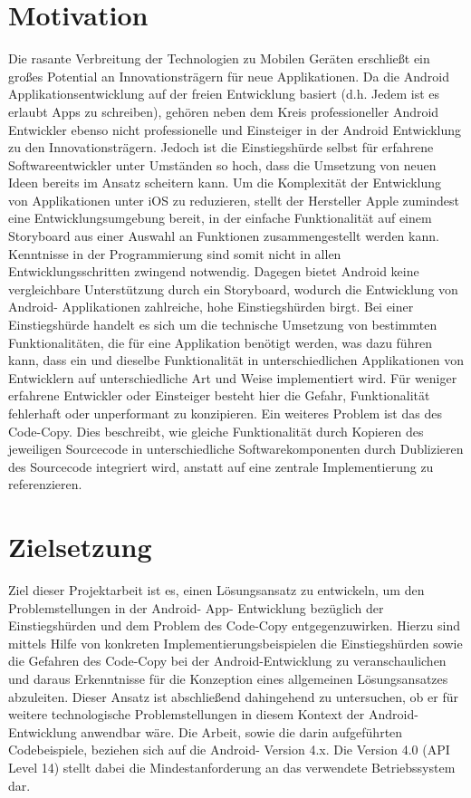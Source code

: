 \documentclass[12pt,oneside,a4paper,bibtotoc,liststotoc]{scrreprt}
\begin{document}
\section{Motivation}
Die rasante Verbreitung der Technologien zu Mobilen Geräten erschließt ein großes Potential an Innovationsträgern für neue Applikationen. Da die Android Applikationsentwicklung auf der freien Entwicklung basiert (d.h. Jedem ist es erlaubt Apps zu schreiben), gehören neben dem Kreis professioneller Android Entwickler ebenso nicht professionelle und Einsteiger in der Android Entwicklung zu den Innovationsträgern. Jedoch ist die Einstiegshürde selbst für erfahrene Softwareentwickler unter Umständen so hoch, dass die Umsetzung von neuen Ideen bereits im Ansatz scheitern kann. Um die Komplexität der Entwicklung von Applikationen unter iOS zu reduzieren, stellt der Hersteller Apple zumindest eine Entwicklungsumgebung bereit, in der einfache Funktionalität auf einem Storyboard aus einer Auswahl an Funktionen zusammengestellt werden kann. Kenntnisse in der Programmierung sind somit nicht in allen Entwicklungsschritten zwingend notwendig. Dagegen bietet Android keine vergleichbare Unterstützung durch ein Storyboard, wodurch die Entwicklung von Android- Applikationen zahlreiche, hohe Einstiegshürden birgt. Bei einer Einstiegshürde handelt es sich um die technische Umsetzung von bestimmten Funktionalitäten, die für eine Applikation benötigt werden, was  dazu führen kann, dass ein und dieselbe Funktionalität in unterschiedlichen Applikationen von Entwicklern auf unterschiedliche Art und Weise implementiert wird. Für weniger erfahrene Entwickler oder Einsteiger besteht hier die Gefahr, Funktionalität fehlerhaft oder unperformant zu konzipieren.\newline
Ein weiteres Problem ist das des Code-Copy. Dies beschreibt, wie gleiche Funktionalität durch Kopieren des jeweiligen Sourcecode in unterschiedliche Softwarekomponenten durch Dublizieren des Sourcecode integriert wird, anstatt auf eine zentrale Implementierung zu referenzieren.

\section{Zielsetzung}
Ziel dieser Projektarbeit ist es, einen Lösungsansatz zu entwickeln, um den Problemstellungen in der Android- App- Entwicklung bezüglich der Einstiegshürden und dem Problem des Code-Copy entgegenzuwirken. Hierzu sind mittels Hilfe von konkreten Implementierungsbeispielen die Einstiegshürden sowie die Gefahren des Code-Copy bei der Android-Entwicklung zu veranschaulichen und daraus Erkenntnisse für die Konzeption eines allgemeinen Lösungsansatzes abzuleiten. Dieser Ansatz ist abschließend dahingehend zu untersuchen, ob er für weitere technologische Problemstellungen in diesem Kontext der Android- Entwicklung anwendbar wäre. Die Arbeit, sowie die darin aufgeführten Codebeispiele, beziehen sich auf die Android- Version 4.x. Die Version 4.0 (API Level 14) stellt dabei die Mindestanforderung an das verwendete Betriebssystem dar.
\end{document}
